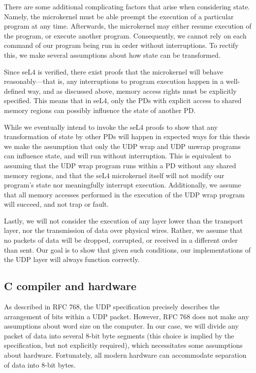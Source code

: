\documentclass[twoside]{memoir}
\begin{document}
There are some additional complicating factors that arise when considering
state.
Namely, the microkernel must be able preempt the execution
of a particular program at any time.
Afterwards, the microkernel may either resume execution of the program,
or execute another program.
Consequently, we cannot rely on each command of our program
being run in order without interruptions.
To rectify this, we make several assumptions about how state can be transformed.

Since seL4 is verified, there exist proofs that the microkernel
will behave reasonably---that is, any interruptions to program execution
happen in a well-defined way, and as discussed above, memory access rights
must be explicitly specified.
This means that in seL4, only the PDs with explicit access to
shared memory regions can possibly influence the state of another PD.

While we eventually intend to invoke the seL4 proofs to show that any
transformation of state by other PDs will happen in expected ways
for this thesis we make the assumption that
only the UDP wrap and UDP unwrap programs can influence state,
and will run without interruption.
This is equivalent to assuming that the UDP wrap program runs within
a PD without any shared memory regions, and that the seL4 microkernel itself
will not modify our program's state nor meaningfully interrupt execution.
Additionally, we assume that all memory accesses performed in the execution of
the UDP wrap program will succeed, and not trap or fault.

Lastly,
we will not consider the execution of any layer lower than the transport layer,
nor the transmission of data over physical wires.
Rather, we assume that no packets of data will be dropped, corrupted, or received in
a different order than sent.
Our goal is to show that given such conditions,
our implementations of the UDP layer will always function correctly.

\subsection{C compiler and hardware}
As described in RFC 768, the UDP specification precisely describes
the arrangement of bits within a UDP packet.
However, RFC 768 does not make any assumptions about word size on the computer.
In our case, we will divide any packet of data into several 8-bit byte segments
(this choice is implied by the specification, but not explicitly required),
which necessitates some assumptions about hardware.
Fortunately, all modern hardware can accommodate separation of data
into 8-bit bytes.
\end{document}
